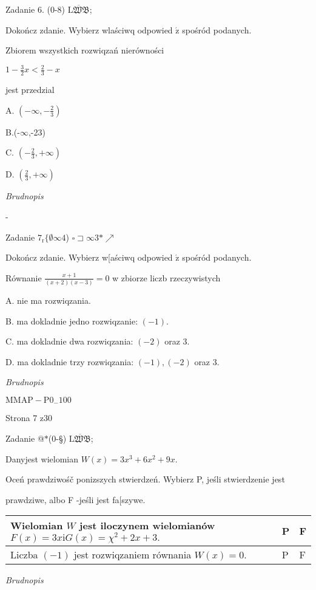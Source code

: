 \documentclass[a4paper,12pt]{article}
\begin{document}
Zadanie 6. (0-8) $\overline{\mathrm{L}\mathfrak{W}\mathfrak{B}}$;

Dokończ zdanie. Wybierz wlaściwq odpowied $\acute{\mathrm{z}}$ spośród podanych.

Zbiorem wszystkich rozwiqzań nierówności

$1-\displaystyle \frac{3}{2}x<\frac{2}{3}-x$

jest przedzial

A. $(-\displaystyle \infty,-\frac{2}{3})$

B.(-$\infty$,-23)

C. $(-\displaystyle \frac{2}{3},+\infty)$

D. $(\displaystyle \frac{2}{3},+\infty)$

{\it Brudnopis}

-

Zadanie $7_{\mathrm{r}}\{\emptyset\infty 4$) $\square \sqsupset\infty 3*\nearrow$

Dokończ zdanie. Wybierz w[aściwq odpowied $\acute{\mathrm{z}}$ spośród podanych.

Równanie $\displaystyle \frac{x+1}{(x+2)(x-3)}=0$ w zbiorze liczb rzeczywistych

A. nie ma rozwiqzania.

B. ma dokladnie jedno rozwiqzanie: $(-1).$

C. ma dokladnie dwa rozwiqzania: $(-2)$ oraz 3.

D. ma dokladnie trzy rozwiqzania: $(-1), (-2)$ oraz 3.

{\it Brudnopis}

$\mathrm{M}\mathrm{M}\mathrm{A}\mathrm{P}-\mathrm{P}0_{-}100$

Strona 7 z30





Zadanie @$*$(0-\S) $\overline{\mathrm{L}\mathfrak{W}\mathfrak{B}}$;

Danyjest wielomian $W(x)=3x^{3}+6x^{2}+9x.$

Oceń prawdziwośč ponizszych stwierdzeń. Wybierz P, jeśli stwierdzenie jest

prawdziwe, albo F -jeśli jest fa[szywe.
\begin{center}
\begin{tabular}{|l|l|l|}
\hline
\multicolumn{1}{|l|}{Wielomian $W$ jest iloczynem wielomianów $F(x)=3x \mathrm{i} G(x)=\chi^{2}+2x+3.$}&	\multicolumn{1}{|l|}{P}&	\multicolumn{1}{|l|}{F}	\\
\hline
\multicolumn{1}{|l|}{Liczba $(-1)$ jest rozwiqzaniem równania $W(x)=0.$}&	\multicolumn{1}{|l|}{P}&	\multicolumn{1}{|l|}{F}	\\
\hline
\end{tabular}

\end{center}
{\it Brudnopis}
\end{document}
